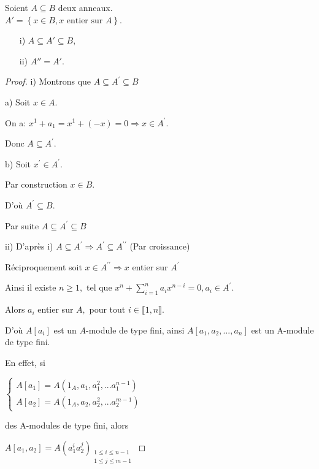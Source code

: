 \begin{maproposition}
	Soient $A \subseteq B$ deux anneaux.\\
	$A' =\left\{x \in B, x\text{ entier sur } A\right\}$.
	\begin{enumerate}
		\item[i)] $A \subseteq A' \subseteq B $,
		\item[ii)] $A'' = A'$.
	\end{enumerate}
\end{maproposition}
\begin{proof}
	i) Montrons que $A\subseteq A^{\prime }\subseteq B$
	
	a) Soit $x\in A.$
	
	On a: $x^{1}+a_{1}=x^{1}+(-x)=0\Rightarrow x\in A^{\prime }.$
	
	Donc $A\subseteq A^{\prime }.$
	
	b) Soit $x^{\prime }\in A^{\prime }.$ 
	
	Par construction $x\in B.$
	
	D'où $A^{\prime }\subseteq B.$
	
	Par suite $A \subseteq A^{\prime }\subseteq B$
	
	
	
	ii) D'après i) $A\subseteq A^{\prime }\Rightarrow A^{\prime }\subseteq
	A^{\prime \prime }$ (Par croissance)
	
	Réciproquement soit $x\in A^{\prime \prime }\Rightarrow x$ entier sur $%
	A^{\prime }$
	
	Ainsi il existe $n\geq 1,$ tel que  $x^{n}+\sum%
	\limits_{i=1}^{n}a_{i}x^{n-i}=0,a_{i}\in A^{\prime }.$
	
	Alors $a_{i}$ entier sur $A,$ pour tout $i\in \llbracket 1, n \rrbracket.$
	
	D'où $A[a_{i}]$ est un $A$-module de type fini, ainsi $%
	A[a_{1},a_{2},...,a_{n}]$ est un A-module de type fini.
	
	En effet, si
	
	$\left\{ 
	\begin{array}{c}
		A[a_{1}]=A(1_{A},a_{1},a_{1}^{2},...a_{1}^{n-1}) \\ 
		A[a_{2}]=A(1_{A},a_{2},a_{2}^{2},...a_{2}^{m-1})%
	\end{array}%
	\right. $
	
	des A-modules de type fini, alors 
	
	$A[a_{1},a_{2}]=A(a_{1}^{i}a_{2}^{j})_{\substack{ 1\leq i\leq n-1 \\ 1\leq
			j\leq m-1}}$
	

\end{proof}
